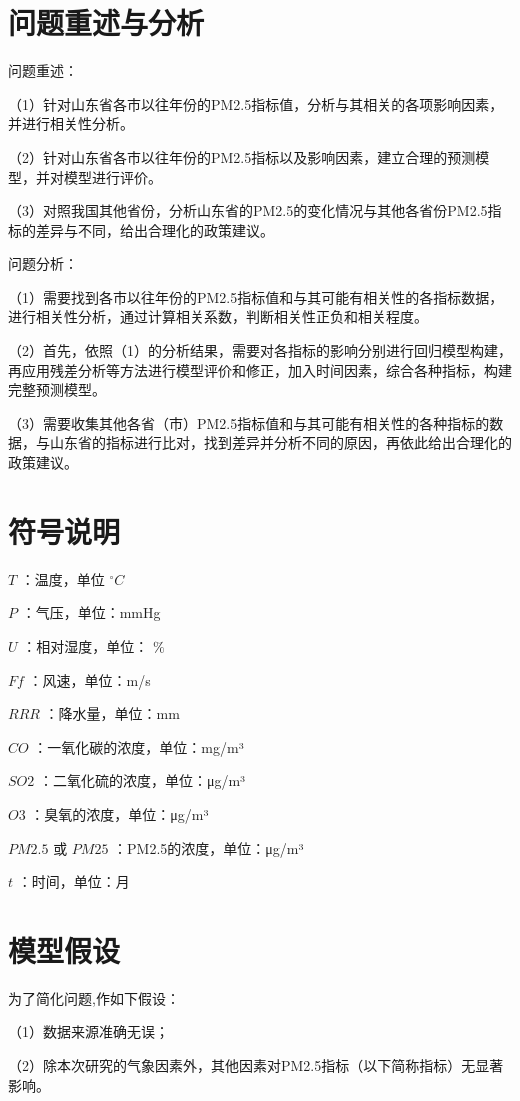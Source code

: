 \documentclass[12pt, a4paper, oneside]{ctexart}
\begin{document}
    \section{问题重述与分析}
    问题重述：
    \par （1）针对山东省各市以往年份的PM2.5指标值，分析与其相关的各项影响因素，并进行相关性分析。
    \par （2）针对山东省各市以往年份的PM2.5指标以及影响因素，建立合理的预测模型，并对模型进行评价。
    \par （3）对照我国其他省份，分析山东省的PM2.5的变化情况与其他各省份PM2.5指标的差异与不同，给出合理化的政策建议。
    \par 问题分析：
    \par （1）需要找到各市以往年份的PM2.5指标值和与其可能有相关性的各指标数据，进行相关性分析，通过计算相关系数，判断相关性正负和相关程度。
    \par （2）首先，依照（1）的分析结果，需要对各指标的影响分别进行回归模型构建，再应用残差分析等方法进行模型评价和修正，加入时间因素，综合各种指标，构建完整预测模型。
    \par （3）需要收集其他各省（市）PM2.5指标值和与其可能有相关性的各种指标的数据，与山东省的指标进行比对，找到差异并分析不同的原因，再依此给出合理化的政策建议。


    \section{符号说明}

    $T$ ：温度，单位 ${}^\circ C$
    \par $P$ ：气压，单位：mmHg
    \par $U$ ：相对湿度，单位： $\%$
    \par $Ff$ ：风速，单位：m/s
    \par $RRR$ ：降水量，单位：mm
    \par $CO$ ：一氧化碳的浓度，单位：mg/m³
    \par $SO2$ ：二氧化硫的浓度，单位：μg/m³
    \par $O3$ ：臭氧的浓度，单位：μg/m³
    \par $PM2.5$ 或 $PM25$ ：PM2.5的浓度，单位：μg/m³
    \par $t$ ：时间，单位：月


    \section{模型假设}
    为了简化问题,作如下假设：
    \par （1）数据来源准确无误；
    \par （2）除本次研究的气象因素外，其他因素对PM2.5指标（以下简称指标）无显著影响。
\end{document}
